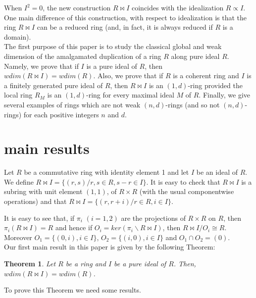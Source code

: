 \documentclass{amsart}
\newtheorem{theorem}{Theorem}[section]
\theoremstyle{definition}
\theoremstyle{remark}
\theoremstyle{Definition and Notation}
\begin{document}
When $I^{2}=0$, the new construction $R\bowtie I $ coincides with
the idealization $R\propto I$. One main difference of this
construction, with respect to idealization is that the ring
$R\bowtie I $ can be a reduced ring (and, in fact, it is always
reduced if $R$ is a domain). \\
The first purpose of this paper is to study the classical global
and weak dimension of the amalgamated duplication of a ring $R$
along pure ideal $R$. Namely, we prove that if $I$ is a pure ideal
of $R$, then $wdim (R\bowtie I)= wdim (R)$.  Also,  we prove that
if $R$ is a coherent ring  and $I$ is a finitely generated pure
ideal of $R$, then $R\bowtie I$ is an $(1,d)$-ring provided the
local ring $R_{M}$ is an $(1,d)$-ring  for every maximal ideal $M$
of $R$. Finally, we give several  examples of rings which are
not weak $(n,d)$-rings (and so not $(n,d)$-rings) for each positive integers $n$ and $d$. \\

\section{main results}
Let $R$ be a commutative ring with identity element 1 and let $I$
be an ideal of $R$. We define $R\bowtie I =\{(r,s)/r,s\in R,s-r\in
I\}$. It is easy to check that $R\bowtie I$ is a subring with unit
element $(1,1)$,  of $R\times R$ (with the usual componentwise
operations) and that $R\bowtie I =\{(r,r+i)/r\in R,i\in I\}$.

It is easy to see that, if $ \pi_{i}$ $(i=1,2)$ are the
projections of $R\times R$ on $R$, then $\pi_{i}(R\bowtie I)=R$
 and hence if $O_{i}=ker(\pi_{i}\backslash R\bowtie I)$, then
$R\bowtie I/O_{i}\cong R$. Moreover $O_{1}=\{(0,i),i\in I\}$,
 $O_{2}=\{(i,0), i\in I\}$ and $O_{1}\cap O_{2}=(0)$.\\

Our first main result in this paper is given by the following
Theorem:
\begin{theorem}\label{1}
Let $R$ be a ring and   $I$ be a pure ideal of $R$. Then, $wdim
(R\bowtie I)= wdim (R)$.
\end{theorem}

To prove this Theorem we need some results.
\end{document}
